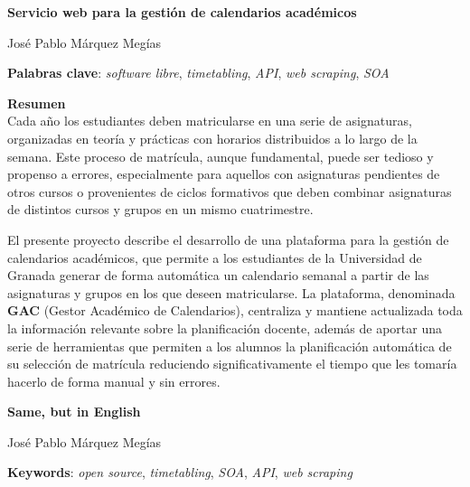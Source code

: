 \thispagestyle{empty}

\begin{center}
{\large\bfseries Servicio web para la gestión de calendarios académicos}\\
\end{center}
\begin{center}
José Pablo Márquez Megías\\
\end{center}


\vspace{0.5cm}
\noindent\textbf{Palabras clave}: \textit{software libre}, \textit{timetabling}, \textit{API}, \textit{web scraping}, \textit{SOA}
\vspace{0.7cm}

\noindent\textbf{Resumen}\\

Cada año los estudiantes deben matricularse en una serie de asignaturas, organizadas en teoría y prácticas con horarios distribuidos a lo largo de la semana. Este proceso de matrícula, aunque fundamental, puede ser tedioso y propenso a errores, especialmente para aquellos con asignaturas pendientes de otros cursos o provenientes de ciclos formativos que deben combinar asignaturas de distintos cursos y grupos en un mismo cuatrimestre.\newline

El presente proyecto describe el desarrollo de una plataforma para la gestión de calendarios académicos, que permite a los estudiantes de la Universidad de Granada generar de forma automática un calendario semanal a partir de las asignaturas y grupos en los que deseen matricularse. La plataforma, denominada \textbf{GAC} (Gestor Académico de Calendarios), centraliza y mantiene actualizada toda la información relevante sobre la planificación docente, además de aportar una serie de herramientas que permiten a los alumnos la planificación automática de su selección de matrícula reduciendo significativamente el tiempo que les tomaría hacerlo de forma manual y sin errores.\newline
	

\cleardoublepage

\begin{center}
	{\large\bfseries Same, but in English}\\
\end{center}
\begin{center}
	José Pablo Márquez Megías\\
\end{center}
\vspace{0.5cm}
\noindent\textbf{Keywords}: \textit{open source}, \textit{timetabling}, \textit{SOA}, \textit{API}, \textit{web scraping}
\vspace{0.7cm}

